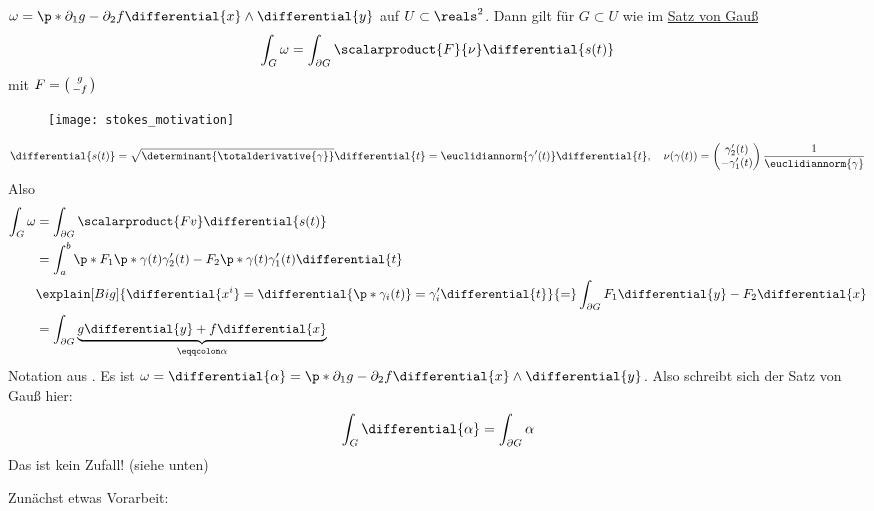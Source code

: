 \begin{beispiel*}
  \( \omega=\p*{ \partial_1g-\partial_2f }\differential{x}\wedge\differential{y} \) auf \( U\subset \reals^2 \).
  Dann gilt für \( G\subset U \) wie im \hyperref[integralsatz_gauss]{Satz von Gauß} 
  \begin{equation*}
      \int_G\omega=\int_{\partial G}\scalarproduct{F}{\nu}\differential{s(t)}
  \end{equation*}
  mit \( F=\begin{psmallmatrix} g\\-f \end{psmallmatrix} \)
  \begin{figure}[H]
    \centering
    \texttt{[image: stokes\_motivation]}
    \label{fig:stokes_motivation}
  \end{figure}
  \begin{equation*}
      \differential{s(t)}=\sqrt{\determinant{\totalderivative{\gamma}}}\differential{t}=\euclidiannorm{\gamma'(t)}\differential{t},\quad \nu(\gamma(t))=\begin{pmatrix} \gamma_2'(t)\\-\gamma_1'(t) \end{pmatrix} \frac{1}{\euclidiannorm{\gamma}} 
  \end{equation*}
  Also 
  \begin{align*}
      \int_{G}\omega &= \int_{\partial G}\scalarproduct{Fv}\differential{s(t)}\\
      &= \int_{a}^{b}\p*{ F_1\p*{\gamma(t)}\gamma_2'(t)-F_2\p*{\gamma(t)}\gamma_1'(t) }\differential{t}\\
      &\explain[Big]{ \differential{x^i}=\differential{\p*{ \gamma_i(t) }}=\gamma_i'\differential{t}}{=}
      \int_{\partial G}F_1\differential{y}-F_2\differential{x}\\
      &= \int_{\partial G}\underbrace{g\differential{y}+f\differential{x}}_{\eqqcolon \alpha}
  \end{align*}
  Notation aus .
  Es ist \( \omega=\differential{\alpha}=\p*{ \partial_1g-\partial_2f }\differential{x}\wedge\differential{y} \).
  Also schreibt sich der Satz von Gauß hier:
  \begin{equation*}
      \int_{G}\differential{\alpha}=\int_{\partial G}\alpha
  \end{equation*}
  Das ist kein Zufall! (siehe unten)
\end{beispiel*}

Zunächst etwas Vorarbeit:

